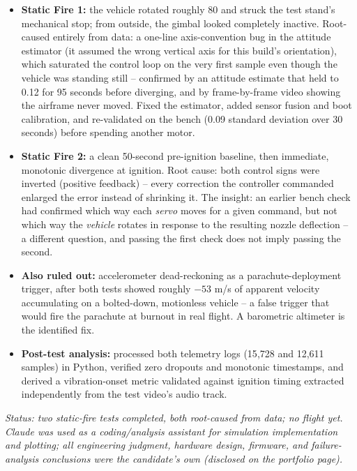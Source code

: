 \documentclass[11pt,letterpaper]{article}
\begin{document}
\begin{itemize}
  \item \textbf{Static Fire 1:} the vehicle rotated roughly 80\textdegree{} and struck the test stand's mechanical stop; from outside, the gimbal looked completely inactive. Root-caused entirely from data: a one-line axis-convention bug in the attitude estimator (it assumed the wrong vertical axis for this build's orientation), which saturated the control loop on the very first sample even though the vehicle was standing still -- confirmed by an attitude estimate that held to 0.12\textdegree{} for 95 seconds before diverging, and by frame-by-frame video showing the airframe never moved. Fixed the estimator, added sensor fusion and boot calibration, and re-validated on the bench (0.09\textdegree{} standard deviation over 30 seconds) before spending another motor.
  \item \textbf{Static Fire 2:} a clean 50-second pre-ignition baseline, then immediate, monotonic divergence at ignition. Root cause: both control signs were inverted (positive feedback) -- every correction the controller commanded enlarged the error instead of shrinking it. The insight: an earlier bench check had confirmed which way each \emph{servo} moves for a given command, but not which way the \emph{vehicle} rotates in response to the resulting nozzle deflection -- a different question, and passing the first check does not imply passing the second.
  \item \textbf{Also ruled out:} accelerometer dead-reckoning as a parachute-deployment trigger, after both tests showed roughly $-53$ m/s of apparent velocity accumulating on a bolted-down, motionless vehicle -- a false trigger that would fire the parachute at burnout in real flight. A barometric altimeter is the identified fix.
  \item \textbf{Post-test analysis:} processed both telemetry logs (15{,}728 and 12{,}611 samples) in Python, verified zero dropouts and monotonic timestamps, and derived a vibration-onset metric validated against ignition timing extracted independently from the test video's audio track.
\end{itemize}

\textit{\footnotesize Status: two static-fire tests completed, both root-caused from data; no flight yet. Claude was used as a coding/analysis assistant for simulation implementation and plotting; all engineering judgment, hardware design, firmware, and failure-analysis conclusions were the candidate's own (disclosed on the portfolio page).}
\end{document}
